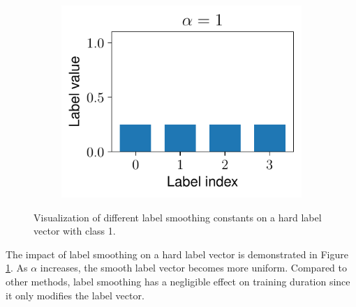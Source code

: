 \begin{figure}[ht]
\begin{subfigure}{0.32\textwidth}
    \end{subfigure}
    \begin{subfigure}{0.32\textwidth}
        \includegraphics[width=1\linewidth]{figures/ls_plot_2.pdf}
    \end{subfigure}
    \caption{Visualization of different label smoothing constants on a hard label vector with class 1.}
    \label{fig:lab_vis}
\end{figure}
The impact of label smoothing on a hard label vector is demonstrated in Figure \ref{fig:lab_vis}. As $\alpha$ increases, the smooth label vector becomes more uniform. Compared to other methods, label smoothing has a negligible effect on training duration since it only modifies the label vector.

